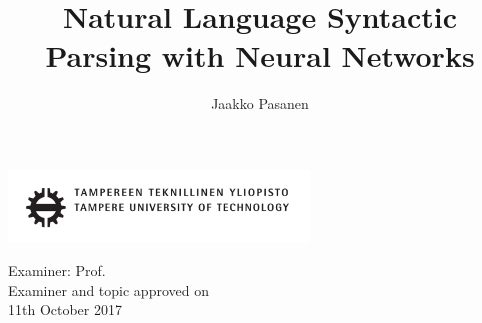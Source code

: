 \documentclass[12pt,a4paper,english
]{tutthesis}
\author{Jaakko Pasanen}
\title{Natural Language Syntactic Parsing with Neural Networks} %
\begin{document}
\makeatletter

%
\thispagestyle{empty}
\vspace*{-.5cm}\noindent
\includegraphics[width=8cm]{tty_tut_logo}   %

\vspace{6.8cm}
\maketitle
\vspace{6.7cm} %

\begin{flushright}  
  \begin{minipage}[c]{6.8cm}
    \begin{spacing}{1.0}
      \textsf{Examiner: Prof. \@examiner}\\
      \textsf{Examiner and topic approved on}\\ 
      \textsf{11th October 2017}\\
    \end{spacing}
  \end{minipage}
\end{flushright}

\if@twoside
\clearpage
\fi

%
\setcounter{page}{0} %

\end{document}
